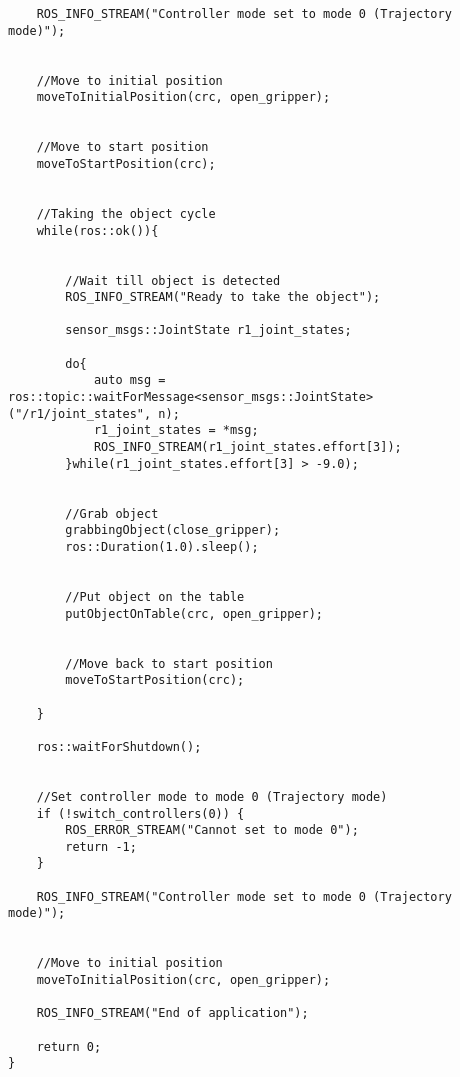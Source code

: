 \begin{lstlisting}
	ROS_INFO_STREAM("Controller mode set to mode 0 (Trajectory mode)");

	
	//Move to initial position
	moveToInitialPosition(crc, open_gripper);


	//Move to start position
	moveToStartPosition(crc);


	//Taking the object cycle
	while(ros::ok()){


		//Wait till object is detected
		ROS_INFO_STREAM("Ready to take the object");

		sensor_msgs::JointState r1_joint_states;

		do{
			auto msg = ros::topic::waitForMessage<sensor_msgs::JointState>("/r1/joint_states", n);
			r1_joint_states = *msg;
			ROS_INFO_STREAM(r1_joint_states.effort[3]);
		}while(r1_joint_states.effort[3] > -9.0);


		//Grab object
		grabbingObject(close_gripper);
		ros::Duration(1.0).sleep();


		//Put object on the table
		putObjectOnTable(crc, open_gripper);


		//Move back to start position
		moveToStartPosition(crc);

	}

	ros::waitForShutdown();


	//Set controller mode to mode 0 (Trajectory mode)
	if (!switch_controllers(0)) {
		ROS_ERROR_STREAM("Cannot set to mode 0");
		return -1;
	}

	ROS_INFO_STREAM("Controller mode set to mode 0 (Trajectory mode)");


	//Move to initial position
	moveToInitialPosition(crc, open_gripper);

	ROS_INFO_STREAM("End of application");

	return 0;
}
\end{lstlisting}
